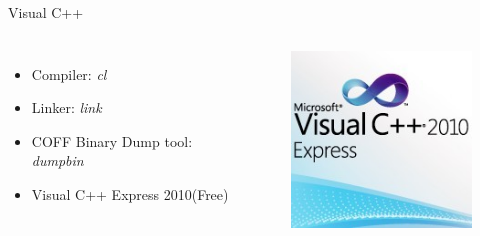 \begin{frame}[t]{Visual C++}
    \begin{columns}
    \begin{itemize}
        \item Compiler: \emph{cl}
        \item Linker: \emph{link}
        \item COFF Binary Dump tool: \emph{dumpbin}
        \item Visual C++ Express 2010(Free)\\
            \href{http://www.microsoft.com/visualstudio/cht/downloads\#d-2010-express}{}
    \end{itemize}
    \begin{figure}
        \begin{center}
            \includegraphics[width=.7\textwidth]{./image/Visual-C++-2010-Express.jpg}
        \end{center}
    \end{figure}
\end{columns}
\end{frame}

